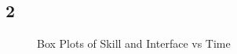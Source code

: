 \documentclass{article}
\begin{document}
    \subsection*{2}
	\begin{figure}[H]
		\centering
          \caption{Box Plots of Skill and Interface vs Time}
          \label{fig:srchbox}
	\end{figure}
	
\end{document}
